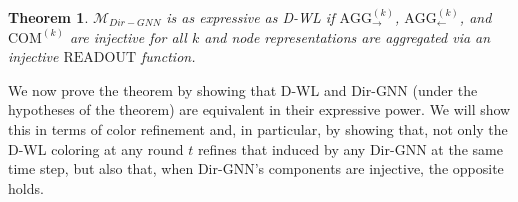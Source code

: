 \documentclass{article}
\newcommand{\inp}{\leftarrow}
\newcommand{\out}{\rightarrow}
\newcommand\oursacro{Dir-GNN}
\theoremstyle{plain}
\newtheorem{theorem}{Theorem}[section]
\theoremstyle{definition}
\theoremstyle{remark}
\begin{document}
\begin{theorem}\label{thm:dirgnn-as-expressive-as-d-wl-formal}
    $\mathcal{M}_{\oursacro{}}$ is as expressive as D-WL if $\mathrm{AGG}^{(k)}_{\out}$, $\mathrm{AGG}^{(k)}_{\inp}$, and $\mathrm{COM}^{(k)}$ are injective for all $k$ and node representations are aggregated via an injective $\mathrm{READOUT}$ function. 
\end{theorem}

We now prove the theorem by showing that D-WL and \oursacro{} (under the hypotheses of the theorem) are equivalent in their expressive power. We will show this in terms of color refinement and, in particular, by showing that, not only the D-WL coloring at any round $t$ refines that induced by any \oursacro{} at the same time step, but also that, when \oursacro{}'s components are injective, the opposite holds.
\end{document}
